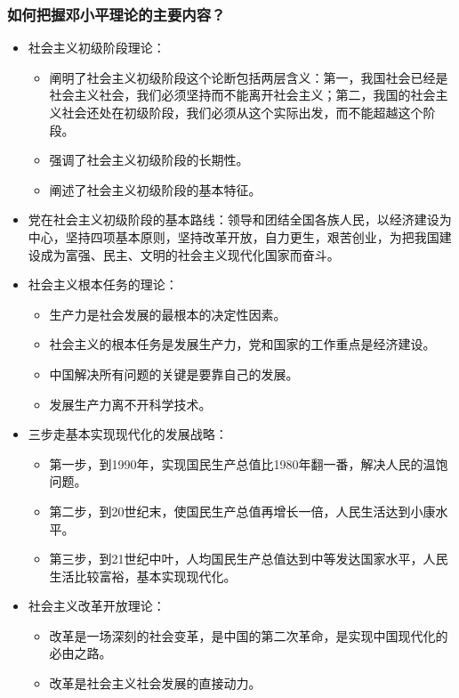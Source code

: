 \documentclass{article}
\begin{document}
\subsubsection{如何把握邓小平理论的主要内容？}
\begin{itemize}
    \item 社会主义初级阶段理论：
    \begin{itemize}
        \item 阐明了社会主义初级阶段这个论断包括两层含义：第一，我国社会已经是社会主义社会，我们必须坚持而不能离开社会主义；第二，我国的社会主义社会还处在初级阶段，我们必须从这个实际出发，而不能超越这个阶段。
        \item 强调了社会主义初级阶段的长期性。
        \item 阐述了社会主义初级阶段的基本特征。
    \end{itemize}
    \item 党在社会主义初级阶段的基本路线：领导和团结全国各族人民，以经济建设为中心，坚持四项基本原则，坚持改革开放，自力更生，艰苦创业，为把我国建设成为富强、民主、文明的社会主义现代化国家而奋斗。
    \item 社会主义根本任务的理论：
    \begin{itemize}
        \item 生产力是社会发展的最根本的决定性因素。
        \item 社会主义的根本任务是发展生产力，党和国家的工作重点是经济建设。
        \item 中国解决所有问题的关键是要靠自己的发展。
        \item 发展生产力离不开科学技术。
    \end{itemize}
    \item 三步走基本实现现代化的发展战略：
    \begin{itemize}
        \item 第一步，到1990年，实现国民生产总值比1980年翻一番，解决人民的温饱问题。
        \item 第二步，到20世纪末，使国民生产总值再增长一倍，人民生活达到小康水平。
        \item 第三步，到21世纪中叶，人均国民生产总值达到中等发达国家水平，人民生活比较富裕，基本实现现代化。
    \end{itemize}
    \item 社会主义改革开放理论：
    \begin{itemize}
        \item 改革是一场深刻的社会变革，是中国的第二次革命，是实现中国现代化的必由之路。
        \item 改革是社会主义社会发展的直接动力。

\end{itemize}
\end{itemize}
\end{document}
